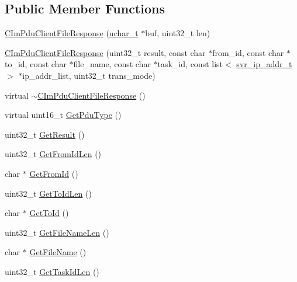 \subsection*{Public Member Functions}
\begin{DoxyCompactItemize}
\item 
\hyperlink{class_c_im_pdu_client_file_response_adda60615bcd420c3a07eed62d2ef67a8}{C\+Im\+Pdu\+Client\+File\+Response} (\hyperlink{base_2ostype_8h_a124ea0f8f4a23a0a286b5582137f0b8d}{uchar\+\_\+t} $\ast$buf, uint32\+\_\+t len)
\item 
\hyperlink{class_c_im_pdu_client_file_response_a20519dbd41b06599f85a65b9c344ce88}{C\+Im\+Pdu\+Client\+File\+Response} (uint32\+\_\+t result, const char $\ast$from\+\_\+id, const char $\ast$to\+\_\+id, const char $\ast$file\+\_\+name, const char $\ast$task\+\_\+id, const list$<$ \hyperlink{structsvr__ip__addr__t}{svr\+\_\+ip\+\_\+addr\+\_\+t} $>$ $\ast$ip\+\_\+addr\+\_\+list, uint32\+\_\+t trans\+\_\+mode)
\item 
virtual \hyperlink{class_c_im_pdu_client_file_response_a9b86336e0ab8ca1c1badc60269599a7c}{$\sim$\+C\+Im\+Pdu\+Client\+File\+Response} ()
\item 
virtual uint16\+\_\+t \hyperlink{class_c_im_pdu_client_file_response_ab457243d842956a616e9f5590594d08a}{Get\+Pdu\+Type} ()
\item 
uint32\+\_\+t \hyperlink{class_c_im_pdu_client_file_response_ac3e4ddc5514d2dc6f215047eafbe47b1}{Get\+Result} ()
\item 
uint32\+\_\+t \hyperlink{class_c_im_pdu_client_file_response_ab174f753bac887ea719972261a1ec280}{Get\+From\+Id\+Len} ()
\item 
char $\ast$ \hyperlink{class_c_im_pdu_client_file_response_a865a804002787b2d58d6d86c1a4a04e4}{Get\+From\+Id} ()
\item 
uint32\+\_\+t \hyperlink{class_c_im_pdu_client_file_response_a944ea93261ccae81da3973a9063b6678}{Get\+To\+Id\+Len} ()
\item 
char $\ast$ \hyperlink{class_c_im_pdu_client_file_response_a2ab971f7a8068376ef6bb4a02aad74f3}{Get\+To\+Id} ()
\item 
uint32\+\_\+t \hyperlink{class_c_im_pdu_client_file_response_ab0f7349986b0b339fa93cab545955e56}{Get\+File\+Name\+Len} ()
\item 
char $\ast$ \hyperlink{class_c_im_pdu_client_file_response_a1136ac07779b2a377c8e21091f1aa59b}{Get\+File\+Name} ()
\item 
uint32\+\_\+t \hyperlink{class_c_im_pdu_client_file_response_ae87b25fa313014da8de41b6fbc8d22df}{Get\+Task\+Id\+Len} ()

\end{DoxyCompactItemize}
